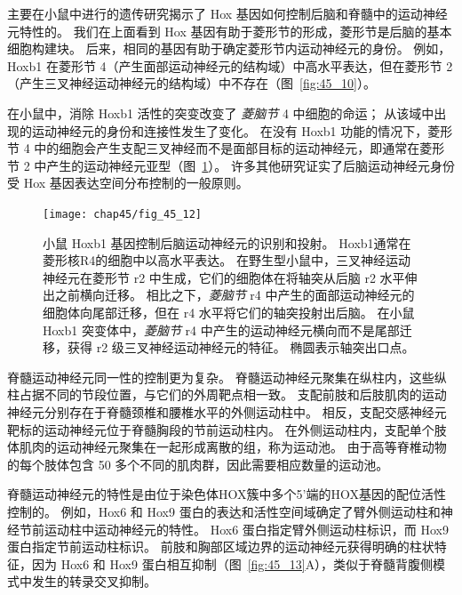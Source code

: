 主要在小鼠中进行的遗传研究揭示了 Hox 基因如何控制后脑和脊髓中的运动神经元特性的。
我们在上面看到 Hox 基因有助于菱形节的形成，菱形节是后脑的基本细胞构建块。
后来，相同的基因有助于确定菱形节内运动神经元的身份。
例如，Hoxb1 在菱形节 4（产生面部运动神经元的结构域）中高水平表达，但在菱形节 2（产生三叉神经运动神经元的结构域）中不存在（图~\ref{fig:45_10}）。


在小鼠中，消除 Hoxb1 活性的突变改变了 \textit{菱脑节} 4 中细胞的命运；
从该域中出现的运动神经元的身份和连接性发生了变化。 
在没有 Hoxb1 功能的情况下，菱形节 4 中的细胞会产生支配三叉神经而不是面部目标的运动神经元，即通常在菱形节 2 中产生的运动神经元亚型（图~\ref{fig:45_12}）。
许多其他研究证实了后脑运动神经元身份受 Hox 基因表达空间分布控制的一般原则。


\begin{figure}[htbp]
	\centering
	\texttt{[image: chap45/fig\_45\_12]}
	\caption{小鼠 Hoxb1 基因控制后脑运动神经元的识别和投射。
		Hoxb1通常在菱形核R4的细胞中以高水平表达。
		在野生型小鼠中，三叉神经运动神经元在菱形节 r2 中生成，它们的细胞体在将轴突从后脑 r2 水平伸出之前横向迁移。
		相比之下，\textit{菱脑节} r4 中产生的面部运动神经元的细胞体向尾部迁移，但在 r4 水平将它们的轴突投射出后脑。
		在小鼠 Hoxb1 突变体中，\textit{菱脑节} r4 中产生的运动神经元横向而不是尾部迁移，获得 r2 级三叉神经运动神经元的特征。
		椭圆表示轴突出口点\cite{studer1996altered}。}
	\label{fig:45_12}
\end{figure}


脊髓运动神经元同一性的控制更为复杂。
脊髓运动神经元聚集在纵柱内，这些纵柱占据不同的节段位置，与它们的外周靶点相一致。
支配前肢和后肢肌肉的运动神经元分别存在于脊髓颈椎和腰椎水平的外侧运动柱中。
相反，支配交感神经元靶标的运动神经元位于脊髓胸段的节前运动柱内。
在外侧运动柱内，支配单个肢体肌肉的运动神经元聚集在一起形成离散的组，称为运动池。
由于高等脊椎动物的每个肢体包含 50 多个不同的肌肉群，因此需要相应数量的运动池。


脊髓运动神经元的特性是由位于染色体HOX簇中多个5'端的HOX基因的配位活性控制的。
例如，Hox6 和 Hox9 蛋白的表达和活性空间域确定了臂外侧运动柱和神经节前运动柱中运动神经元的特性。
Hox6 蛋白指定臂外侧运动柱标识，而 Hox9 蛋白指定节前运动柱标识。
前肢和胸部区域边界的运动神经元获得明确的柱状特征，因为 Hox6 和 Hox9 蛋白相互抑制（图~\ref{fig:45_13}A），类似于脊髓背腹侧模式中发生的转录交叉抑制。


